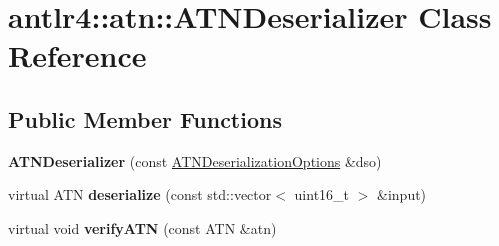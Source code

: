 \hypertarget{classantlr4_1_1atn_1_1ATNDeserializer}{}\section{antlr4\+:\+:atn\+:\+:A\+T\+N\+Deserializer Class Reference}
\label{classantlr4_1_1atn_1_1ATNDeserializer}
\subsection*{Public Member Functions}
\begin{DoxyCompactItemize}
\item 
\mbox{\label{classantlr4_1_1atn_1_1ATNDeserializer_a948f22aa8f3aad8fd65c1a6d8838bc47}} 
{\bfseries A\+T\+N\+Deserializer} (const \hyperlink{classantlr4_1_1atn_1_1ATNDeserializationOptions}{A\+T\+N\+Deserialization\+Options} \&dso)
\item 
\mbox{\label{classantlr4_1_1atn_1_1ATNDeserializer_aefd9354c6031246ae9d09a2bba89cb47}} 
virtual A\+TN {\bfseries deserialize} (const std\+::vector$<$ uint16\+\_\+t $>$ \&input)
\item 
\mbox{\label{classantlr4_1_1atn_1_1ATNDeserializer_a57391bf3e7694c08de4d29db2a69129c}} 
virtual void {\bfseries verify\+A\+TN} (const A\+TN \&atn)
\end{DoxyCompactItemize}
